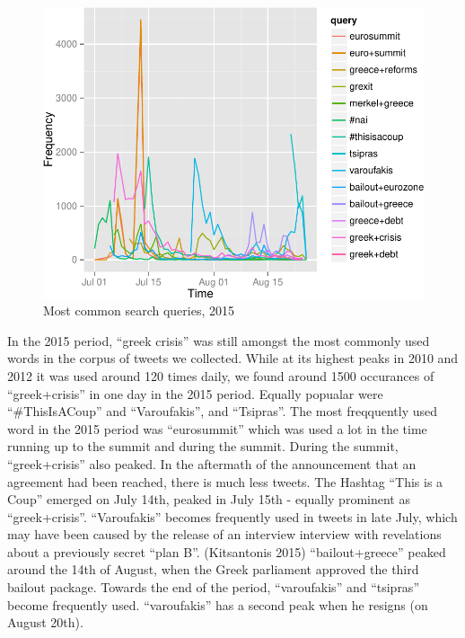 \documentclass[]{article}
\begin{document}
\begin{figure}

{\centering \includegraphics{fin_paper_files/figure-latex/unnamed-chunk-10-1} 

}

\caption{Most common search queries, 2015}\label{fig:unnamed-chunk-10}
\end{figure}

In the 2015 period, ``greek crisis'' was still amongst the most commonly
used words in the corpus of tweets we collected. While at its highest
peaks in 2010 and 2012 it was used around 120 times daily, we found
around 1500 occurances of ``greek+crisis'' in one day in the 2015
period. Equally popualar were ``\#ThisIsACoup'' and ``Varoufakis'', and
``Tsipras''. The most freqquently used word in the 2015 period was
``eurosummit'' which was used a lot in the time running up to the summit
and during the summit. During the summit, ``greek+crisis'' also peaked.
In the aftermath of the announcement that an agreement had been reached,
there is much less tweets. The Hashtag ``This is a Coup'' emerged on
July 14th, peaked in July 15th - equally prominent as ``greek+crisis''.
``Varoufakis'' becomes frequently used in tweets in late July, which may
have been caused by the release of an interview interview with
revelations about a previously secret ``plan B''. (Kitsantonis 2015)
``bailout+greece'' peaked around the 14th of August, when the Greek
parliament approved the third bailout package. Towards the end of the
period, ``varoufakis'' and ``tsipras'' become frequently used.
``varoufakis'' has a second peak when he resigns (on August 20th).
\end{document}
